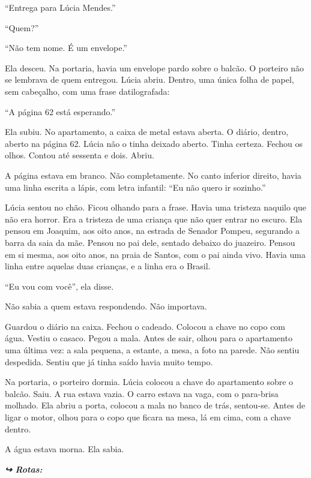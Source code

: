 \noindent ``Entrega para Lúcia Mendes.''

\noindent ``Quem?''

\noindent ``Não tem nome. É um envelope.''

\noindent Ela desceu. Na portaria, havia um envelope pardo sobre o balcão. O porteiro não se lembrava de quem entregou. Lúcia abriu. Dentro, uma única folha de papel, sem cabeçalho, com uma frase datilografada:

\noindent ``A página 62 está esperando.''

\noindent Ela subiu. No apartamento, a caixa de metal estava aberta. O diário, dentro, aberto na página 62. Lúcia não o tinha deixado aberto. Tinha certeza. Fechou os olhos. Contou até sessenta e dois. Abriu.

\noindent A página estava em branco. Não completamente. No canto inferior direito, havia uma linha escrita a lápis, com letra infantil: ``Eu não quero ir sozinho.''

\noindent Lúcia sentou no chão. Ficou olhando para a frase. Havia uma tristeza naquilo que não era horror. Era a tristeza de uma criança que não quer entrar no escuro. Ela pensou em Joaquim, aos oito anos, na estrada de Senador Pompeu, segurando a barra da saia da mãe. Pensou no pai dele, sentado debaixo do juazeiro. Pensou em si mesma, aos oito anos, na praia de Santos, com o pai ainda vivo. Havia uma linha entre aquelas duas crianças, e a linha era o Brasil.

\noindent ``Eu vou com você'', ela disse.

\noindent Não sabia a quem estava respondendo. Não importava.

\noindent Guardou o diário na caixa. Fechou o cadeado. Colocou a chave no copo com água. Vestiu o casaco. Pegou a mala. Antes de sair, olhou para o apartamento uma última vez: a sala pequena, a estante, a mesa, a foto na parede. Não sentiu despedida. Sentiu que já tinha saído havia muito tempo.

\noindent Na portaria, o porteiro dormia. Lúcia colocou a chave do apartamento sobre o balcão. Saiu. A rua estava vazia. O carro estava na vaga, com o para-brisa molhado. Ela abriu a porta, colocou a mala no banco de trás, sentou-se. Antes de ligar o motor, olhou para o copo que ficara na mesa, lá em cima, com a chave dentro.

\noindent A água estava morna. Ela sabia.

\noindent\textit{\textbf{↪ Rotas:}  \rotasep {} \rotasep {}}
